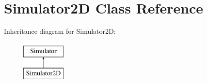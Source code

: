 \hypertarget{class_simulator2_d}{}\section{Simulator2D Class Reference}
\label{class_simulator2_d}
Inheritance diagram for Simulator2D\+:\begin{figure}[H]
\begin{center}
\leavevmode
\includegraphics[height=2.000000cm]{class_simulator2_d}
\end{center}
\end{figure}
